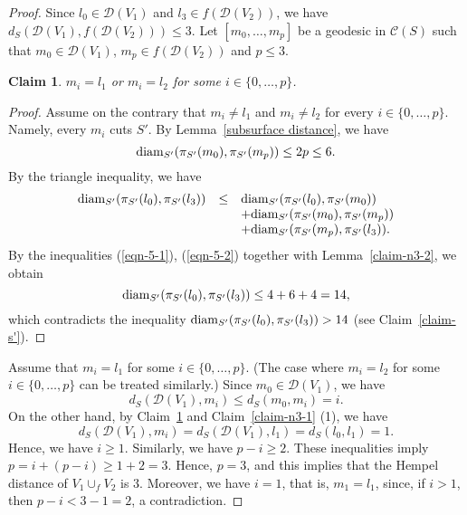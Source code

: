 \documentclass[]{aspm}
\newtheorem{claim}[definition]{Claim}
\begin{document}
\begin{proof}
Since $l_0\in \mathcal{D}(V_1)$ and $l_3\in f(\mathcal{D}(V_2))$, we have $d_S(\mathcal{D}(V_1), f(\mathcal{D}(V_2)))\leq 3$.
Let $[m_0, \dots, m_p]$ be a geodesic in $\mathcal{C}(S)$ such that $m_0\in \mathcal{D}(V_1)$, $m_p\in f(\mathcal{D}(V_2))$ and $p\leq 3$.

\begin{claim}\label{claim-5}
$m_i=l_1$ or $m_i=l_2$ for some $i\in\{0,\dots,p\}$.
\end{claim}

\begin{proof}
Assume on the contrary that $m_i\ne l_1$ and $m_i\ne l_2$ for every $i\in\{0,\dots,p\}$.
Namely, every $m_i$ cuts $S'$.
By Lemma~\ref{subsurface distance}, we have 
\begin{equation}\label{eqn-5-1}
{\rm diam}_{S'}(\pi_{S'}(m_0), \pi_{S'}(m_p))\leq 2p\leq 6.
\end{equation}
By the triangle inequality, we have
\begin{eqnarray}\label{eqn-5-2}
\begin{array}{rcl}
{\rm diam}_{S'}(\pi_{S'}(l_0), \pi_{S'}(l_3))&\leq &{\rm diam}_{S'}(\pi_{S'}(l_0), \pi_{S'}(m_0))\\
&&+{\rm diam}_{S'}(\pi_{S'}(m_0), \pi_{S'}(m_p))\\
&&+{\rm diam}_{S'}(\pi_{S'}(m_p), \pi_{S'}(l_3)).
\end{array}
\end{eqnarray}
By the inequalities (\ref{eqn-5-1}), (\ref{eqn-5-2}) together with Lemma~\ref{claim-n3-2}, we obtain
$$
{\rm diam}_{S'}(\pi_{S'}(l_0), \pi_{S'}(l_3))\leq 4+6+4=14,
$$
which contradicts the inequality ${\rm diam}_{S'}(\pi_{S'}(l_0), \pi_{S'}(l_3))>14$ (see Claim~\ref{claim-s'}).
\end{proof}

Assume that $m_i=l_1$ for some $i\in\{0,\dots,p\}$.
(The case where $m_i=l_2$ for some $i\in\{0,\dots,p\}$ can be treated similarly.)
Since $m_0\in\mathcal{D}(V_1)$, we have
$$
d_S(\mathcal{D}(V_1), m_i)\leq d_S(m_0,m_i)=i.
$$
On the other hand, by Claim~\ref{claim-5} and Claim~\ref{claim-n3-1} (1), we have
$$
d_S(\mathcal{D}(V_1), m_i)=d_S(\mathcal{D}(V_1), l_1)=d_S(l_0,l_1)=1.
$$
Hence, we have $i\geq 1$. Similarly, we have $p-i\geq 2$.
These inequalities imply $p=i+(p-i)\geq 1+2=3$.
Hence, $p=3$, and this implies that the Hempel distance of $V_1\cup_f V_2$ is $3$.
Moreover, we have $i=1$, that is, $m_1=l_1$, since, if $i>1$, then $p-i<3-1=2$, a contradiction.


\end{proof}
\end{document}
